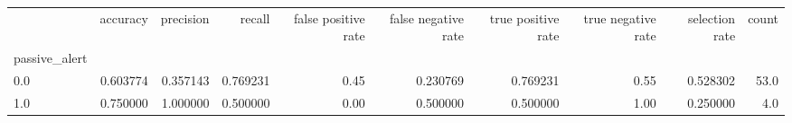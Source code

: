 \begin{tabular}{lrrrrrrrrr}
\toprule
{} &  accuracy &  precision &    recall &  false positive rate &  false negative rate &  true positive rate &  true negative rate &  selection rate &  count \\
passive\_alert &           &            &           &                      &                      &                     &                     &                 &        \\
\midrule
0.0           &  0.603774 &   0.357143 &  0.769231 &                 0.45 &             0.230769 &            0.769231 &                0.55 &        0.528302 &   53.0 \\
1.0           &  0.750000 &   1.000000 &  0.500000 &                 0.00 &             0.500000 &            0.500000 &                1.00 &        0.250000 &    4.0 \\
\bottomrule
\end{tabular}
